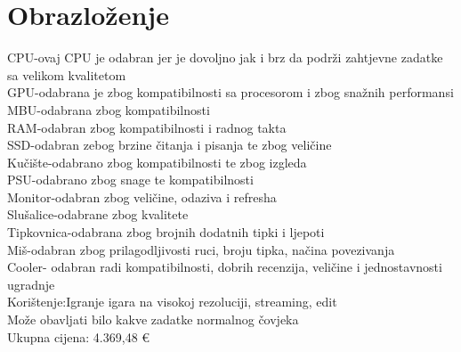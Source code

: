 \documentclass{article}
\begin{document}
\section{Obrazloženje}
CPU-ovaj CPU je odabran jer je dovoljno jak i brz da podrži zahtjevne zadatke sa velikom kvalitetom\\
GPU-odabrana je zbog kompatibilnosti sa procesorom i zbog snažnih performansi\\
MBU-odabrana zbog kompatibilnosti \\
RAM-odabran zbog kompatibilnosti i radnog takta\\
SSD-odabran zebog brzine čitanja i pisanja te zbog veličine\\
Kučište-odabrano zbog kompatibilnosti te zbog izgleda\\
PSU-odabrano zbog snage te kompatibilnosti\\
Monitor-odabran zbog veličine, odaziva i refresha\\
Slušalice-odabrane zbog kvalitete\\
Tipkovnica-odabrana zbog brojnih dodatnih tipki i ljepoti\\
Miš-odabran zbog prilagodljivosti ruci, broju tipka, načina povezivanja\\
Cooler- odabran radi kompatibilnosti, dobrih recenzija, veličine i jednostavnosti ugradnje\\
Korištenje:Igranje igara na visokoj rezoluciji, streaming, edit\\
Može obavljati bilo kakve zadatke normalnog čovjeka\\
Ukupna cijena: 4.369,48 €
\end{document}
